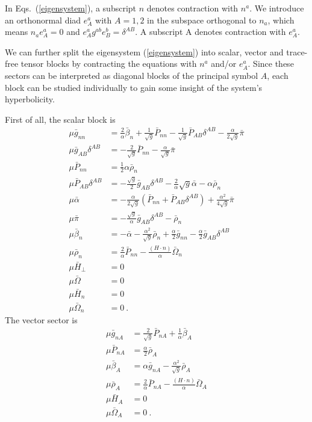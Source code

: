 In Eqs.~(\ref{eigensystem}), a subscript $n$ denotes contraction with $n^{a}$. We introduce an orthonormal diad $e^{a}_{A}$ with $A = 1, 2$ in the subspace orthogonal to $n_{a}$, which means $n_{a}e^{a}_{A} = 0$ and $e^{a}_{A}g^{ab}e^{b}_{B} = \delta^{AB}$. A subscript A denotes contraction with $e^{a}_{A}$.

We can further split the eigensystem (\ref{eigensystem}) into scalar, vector and trace-free tensor blocks by contracting the equations with $n^{a}$ and/or $e^{a}_{A}$. Since these sectors can be interpreted as diagonal blocks of the principal symbol $A$, each block can be studied individually to gain some insight of the system's hyperbolicity. 

First of all, the scalar block is
\begin{subequations}
\begin{align}
\mu {\bar g}_{nn} & = \frac{2}{\alpha}{\bar \beta}_{n} + \frac{1}{\sqrt{g}}{\bar P}_{nn} - \frac{1}{\sqrt{g}}{\bar P}_{AB}\delta^{AB} - \frac{\alpha}{2\sqrt{g}}{\bar \pi}\\
\mu {\bar g}_{AB}\delta^{AB} & = - \frac{2}{\sqrt{g}}{\bar P}_{nn} - \frac{\alpha}{\sqrt{g}}{\bar \pi}\\
\mu {\bar P}_{nn} & = \frac{1}{2}\alpha{\bar \rho}_{n}\\
\mu {\bar P}_{AB}\delta^{AB} & = -\frac{\sqrt{g}}{2}{\bar g}_{AB}\delta^{AB} - \frac{2}{\alpha}\sqrt{g} {\bar \alpha} - \alpha {\bar \rho}_{n}\\
\mu {\bar \alpha} & = - \frac{\alpha}{2\sqrt{g}}\left({\bar P}_{nn} + {\bar P}_{AB}\delta^{AB}\right) + \frac{\alpha^{2}}{4\sqrt{g}}{\bar \pi}\\
\mu {\bar \pi} & = -\frac{\sqrt{g}}{\alpha}{\bar g}_{AB}\delta^{AB} - {\bar \rho}_{n}\\
\mu {\bar \beta}_{n} & = - {\bar \alpha} - \frac{\alpha^{2}}{\sqrt{g}}{\bar \rho}_{n} + \frac{\alpha}{2}{\bar g}_{nn} - \frac{\alpha}{2}{\bar g}_{AB}\delta^{AB}\\
\mu {\bar \rho}_{n} & = \frac{2}{\alpha}{\bar P}_{nn} -  \frac{\left(H \cdot n \right)}{\alpha}{\bar \Omega}_{n}\\
\mu {\bar H}_{\perp} & = 0\\
\mu {\bar \Omega} & = 0\\
\mu {\bar H}_{n} & = 0\\
\mu {\bar \Omega}_{n} & = 0 \ .
\end{align}
\end{subequations}
The vector sector is
\begin{subequations}
\begin{align}
\mu {\bar g}_{nA} & = \frac{2}{\sqrt{g}}{\bar P}_{nA} + \frac{1}{\alpha}{\bar \beta}_{A}\\
\mu {\bar P}_{nA} & = \frac{\alpha}{2}{\bar \rho}_{A}\\
\mu {\bar \beta}_{A} & = \alpha {\bar g}_{nA} - \frac{\alpha^{2}}{\sqrt{g}}{\bar \rho}_{A}\\
\mu {\bar \rho}_{A} & = \frac{2}{\alpha}{\bar P}_{nA} - \frac{\left(H \cdot n \right)}{\alpha}{\bar \Omega}_{A}\\
\mu {\bar H}_{A} & = 0\\
\mu {\bar \Omega}_{A} & = 0 \ .
\end{align}
\end{subequations}
